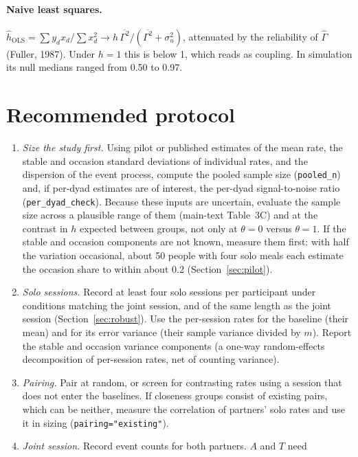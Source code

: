 \documentclass[12pt]{article}
\theoremstyle{definition}
\begin{document}
\paragraph{Naive least squares.}
$\hat h_{\mathrm{OLS}}=\sum y_dx_d/\sum x_d^2\to h\,\overline{\Gamma^2}/(\overline{\Gamma^2}+\sigma_u^2)$,
attenuated by the reliability of $\hat\Gamma$ (Fuller, 1987). Under $h=1$ this is
below 1, which reads as coupling. In simulation its null medians ranged from 0.50
to 0.97.

\section{Recommended protocol}

\begin{enumerate}
\item \emph{Size the study first.} Using pilot or published estimates of the mean
rate, the stable and occasion standard deviations of individual rates, and the
dispersion of the event process, compute the pooled sample size
(\texttt{pooled\_n}) and, if per-dyad estimates are of interest, the per-dyad
signal-to-noise ratio (\texttt{per\_dyad\_check}). Because these inputs are
uncertain, evaluate the sample size across a plausible range of them (main-text
Table~3C) and at the contrast in $h$ expected between groups, not only at
$\theta=0$ versus $\theta=1$. If the stable and occasion components are not known,
measure them first: with half the variation occasional, about 50 people with four
solo meals each estimate the occasion share to within about 0.2
(Section~\ref{sec:pilot}).
\item \emph{Solo sessions.} Record at least four solo sessions per participant
under conditions matching the joint session, and of the same length as the joint
session (Section~\ref{sec:robust}). Use the per-session rates for the
baseline (their mean) and for its error variance (their sample variance divided
by $m$). Report the stable and occasion variance components (a one-way
random-effects decomposition of per-session rates, net of counting variance).
\item \emph{Pairing.} Pair at random, or screen for contrasting rates using a
session that does not enter the baselines. If closeness groups consist of existing
pairs, which can be neither, measure the correlation of partners' solo rates and
use it in sizing (\texttt{pairing="existing"}).
\item \emph{Joint session.} Record event counts for both partners. $A$ and $T$ need

\end{enumerate}
\end{document}
